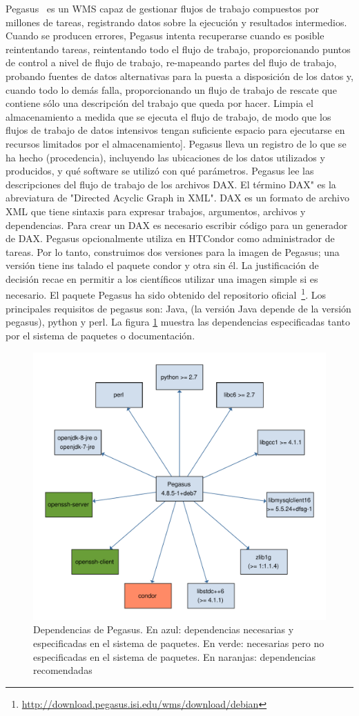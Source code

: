 Pegasus~\cite{} es un WMS capaz de gestionar flujos de trabajo compuestos por millones de tareas, registrando datos sobre la ejecución y resultados intermedios. 
Cuando se producen errores, Pegasus intenta recuperarse cuando es posible reintentando tareas, reintentando todo el flujo de trabajo, proporcionando puntos de control a nivel de flujo de trabajo, re-mapeando partes del flujo de trabajo, probando fuentes de datos alternativas para la puesta a disposición de los datos y, cuando todo lo demás falla, proporcionando un flujo de trabajo de rescate que contiene sólo una descripción del trabajo que queda por hacer. Limpia el almacenamiento a medida que se ejecuta el flujo de trabajo, de modo que los flujos de trabajo de datos intensivos tengan suficiente espacio para ejecutarse en recursos limitados por el almacenamiento]. Pegasus lleva un registro de lo que se ha hecho (procedencia), incluyendo las ubicaciones de los datos utilizados y producidos, y qué software se utilizó con qué parámetros.
Pegasus lee las descripciones del flujo de trabajo de los archivos DAX. El término DAX" es la abreviatura de "Directed Acyclic Graph in XML". DAX es un formato de archivo XML que tiene sintaxis para expresar trabajos, argumentos, archivos y dependencias. Para crear un DAX es necesario escribir código para un generador de DAX. 
Pegasus opcionalmente utiliza en HTCondor como administrador de tareas. Por lo tanto, construimos dos versiones para la imagen de Pegasus; una versión tiene ins
talado el paquete condor y otra sin él. La justificación de decisión recae en permitir a los científicos utilizar una imagen simple si es necesario.
El paquete Pegasus ha sido obtenido del repositorio oficial~\footnote{\url{http://download.pegasus.isi.edu/wms/download/debian}}.
Los principales requisitos de pegasus son: Java,  (la versión Java depende de la versión pegasus), python y perl. La figura \ref{fig:pegasus-deps} muestra las dependencias especificadas tanto por el sistema de paquetes o documentación.

\begin{figure}[t]
\centering
\includegraphics[width=.5\textwidth]{Figures/pegasus-deps}
\caption{Dependencias de Pegasus. En azul: dependencias necesarias y especificadas en el sistema de paquetes. En verde: necesarias pero no especificadas en el sistema de paquetes. En naranjas: dependencias recomendadas}\label{fig:pegasus-deps}
\end{figure}

